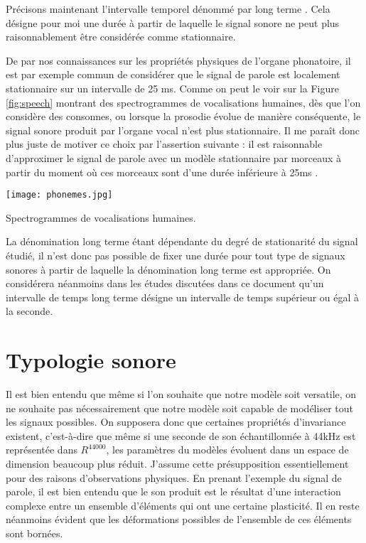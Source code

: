 Précisons maintenant l'intervalle temporel dénommé par \og long terme \fg. Cela désigne pour moi une durée à partir de laquelle le signal sonore ne peut plus raisonnablement être considérée comme stationnaire.

De par nos connaissances sur les propriétés physiques de l'organe phonatoire, il est par exemple commun de considérer que le signal de parole est localement stationnaire sur un intervalle de 25 ms. Comme on peut le voir sur la Figure \ref{fig:speech} montrant des spectrogrammes de vocalisations humaines\cite{ladefoged2014course}, dès que l'on considère des consonnes, ou lorsque la prosodie évolue de manière conséquente, le signal sonore produit par l'organe vocal n'est plus stationnaire. Il me paraît donc plus juste de motiver ce choix par l'assertion suivante : \og il est raisonnable d'approximer le signal de parole avec un modèle stationnaire par morceaux à partir du moment où ces morceaux sont d'une durée inférieure à 25ms \fg.

\begin{marginfigure}
  \texttt{[image: phonemes.jpg]}
  \caption{Spectrogrammes de vocalisations humaines.} %
\end{marginfigure}

La dénomination \og long terme \fg  étant dépendante du degré de stationarité du signal étudié, il n'est donc pas possible de fixer une durée pour tout type de signaux sonores à partir de laquelle la dénomination \og long terme \fg est appropriée. On considérera néanmoins dans les études discutées dans ce document qu'un intervalle de temps  \og long terme \fg désigne un intervalle de temps supérieur ou égal à la seconde.

\section{ \nmu Typologie sonore} \label{sec:typologie}

Il est bien entendu que même si l'on souhaite que notre modèle soit versatile, on ne souhaite pas nécessairement que notre modèle soit capable de modéliser tout les signaux possibles. On supposera donc que certaines propriétés d'invariance existent, c'est-à-dire que même si une seconde de son échantillonnée à 44kHz est représentée dans $R^44000$, les paramètres du modèles évoluent dans un espace de dimension beaucoup plus réduit. J'assume cette présupposition essentiellement pour des raisons d'observations physiques. En prenant l'exemple du signal de parole, il est bien entendu que le son produit est le résultat d'une interaction complexe entre un ensemble d'éléments qui ont une certaine plasticité. Il en reste néanmoins évident que les déformations possibles de l'ensemble de ces éléments sont bornées.

